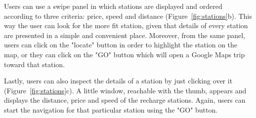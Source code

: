 Users can use a swipe panel in which stations are displayed and ordered according to three criteria: price, speed and distance (Figure~\ref{fig:stations}b).
This way the user can look for the more fit station, given that details of every station are presented in a simple and convenient place. Moreover, from the same panel, users can click on the "locate" button in order to highlight the station on the map, or they can click on the "GO" button which will open a Google Maps trip toward that station.

Lastly, users can also inspect the details of a station by just clicking over it (Figure~\ref{fig:stations}c). A little window, reachable with the thumb, appears and displays the distance, price and speed of the recharge stations. Again, users can start the navigation for that particular station using the "GO" button.

